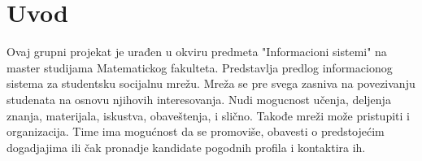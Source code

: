 \section{Uvod}

Ovaj grupni projekat je urađen u okviru predmeta "Informacioni sistemi" na master studijama Matematickog fakulteta. Predstavlja predlog informacionog sistema za studentsku socijalnu mrežu. Mreža se pre svega zasniva na povezivanju studenata na osnovu njihovih interesovanja. Nudi mogucnost učenja, deljenja znanja, materijala, iskustva, obaveštenja, i slično. Takođe mreži može pristupiti i organizacija. Time ima mogućnost da se promoviše, obavesti o predstojećim dogadjajima ili čak pronadje kandidate pogodnih profila i kontaktira ih.
